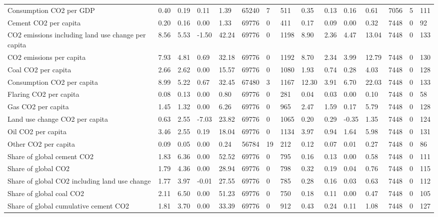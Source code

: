 \begin{longtable}{lllllllllllllll}
Consumption CO2 per GDP & 0.40 & 0.19 & 0.11 & 1.39 & 65240 & 7 & 511 & 0.35 & 0.13 & 0.16 & 0.61 & 7056 & 5 & 111\\
\addlinespace
Cement CO2 per capita & 0.20 & 0.16 & 0.00 & 1.33 & 69776 & 0 & 411 & 0.17 & 0.09 & 0.00 & 0.32 & 7448 & 0 & 92\\
CO2 emissions including land use change per capita & 8.56 & 5.53 & -1.50 & 42.24 & 69776 & 0 & 1198 & 8.90 & 2.36 & 4.47 & 13.04 & 7448 & 0 & 133\\
CO2 emissions per capita & 7.93 & 4.81 & 0.69 & 32.18 & 69776 & 0 & 1192 & 8.70 & 2.34 & 3.99 & 12.79 & 7448 & 0 & 130\\
Coal CO2 per capita & 2.66 & 2.62 & 0.00 & 15.57 & 69776 & 0 & 1080 & 1.93 & 0.74 & 0.28 & 4.03 & 7448 & 0 & 128\\
Consumption CO2 per capita & 8.99 & 5.22 & 0.67 & 32.45 & 67480 & 3 & 1167 & 12.30 & 3.91 & 6.70 & 22.03 & 7448 & 0 & 133\\
\addlinespace
Flaring CO2 per capita & 0.08 & 0.13 & 0.00 & 0.80 & 69776 & 0 & 281 & 0.04 & 0.03 & 0.00 & 0.10 & 7448 & 0 & 58\\
Gas CO2 per capita & 1.45 & 1.32 & 0.00 & 6.26 & 69776 & 0 & 965 & 2.47 & 1.59 & 0.17 & 5.79 & 7448 & 0 & 128\\
Land use change CO2 per capita & 0.63 & 2.55 & -7.03 & 23.82 & 69776 & 0 & 1065 & 0.20 & 0.29 & -0.35 & 1.35 & 7448 & 0 & 124\\
Oil CO2 per capita & 3.46 & 2.55 & 0.19 & 18.04 & 69776 & 0 & 1134 & 3.97 & 0.94 & 1.64 & 5.98 & 7448 & 0 & 131\\
Other CO2 per capita & 0.09 & 0.05 & 0.00 & 0.24 & 56784 & 19 & 212 & 0.12 & 0.07 & 0.01 & 0.27 & 7448 & 0 & 86\\
\addlinespace
Share of global cement CO2 & 1.83 & 6.36 & 0.00 & 52.52 & 69776 & 0 & 795 & 0.16 & 0.13 & 0.00 & 0.58 & 7448 & 0 & 111\\
Share of global CO2 & 1.79 & 4.36 & 0.00 & 28.94 & 69776 & 0 & 798 & 0.32 & 0.19 & 0.04 & 0.76 & 7448 & 0 & 115\\
Share of global CO2 including land use change & 1.77 & 3.97 & -0.01 & 27.55 & 69776 & 0 & 785 & 0.28 & 0.16 & 0.03 & 0.63 & 7448 & 0 & 112\\
Share of global coal CO2 & 2.11 & 6.50 & 0.00 & 51.23 & 69776 & 0 & 750 & 0.18 & 0.11 & 0.00 & 0.47 & 7448 & 0 & 105\\
Share of global cumulative cement CO2 & 1.81 & 3.70 & 0.00 & 33.39 & 69776 & 0 & 912 & 0.43 & 0.24 & 0.11 & 1.08 & 7448 & 0 & 127\\

\end{longtable}
